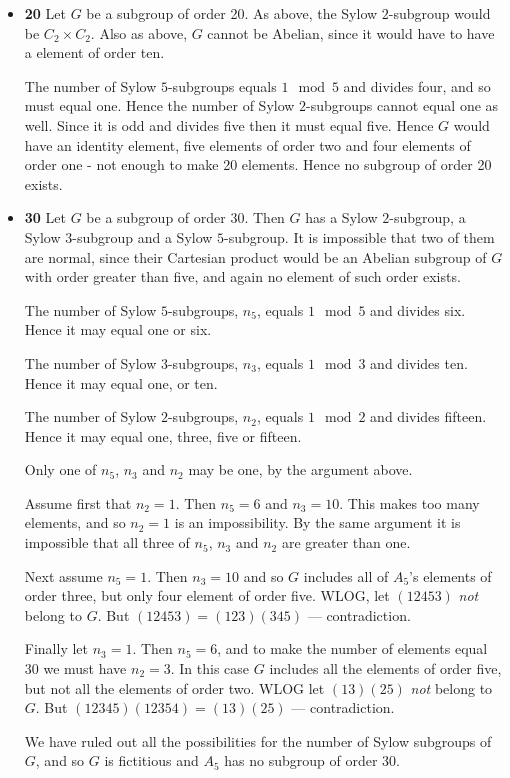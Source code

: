 \documentclass[11pt]{article} \usepackage{amssymb}
\begin{document}
\begin{enumerate}
\begin{itemize}
    \item {\bf 20}
      Let $G$ be a subgroup of order 20.
      As above, the Sylow $2$-subgroup would
      be $C_2\times C_2$. 
      Also as above, $G$  cannot be Abelian, since it would have
      to have a element of order ten.

      The number of Sylow $5$-subgroups equals $1\mod 5$ and divides four,
      and so must equal one. Hence the number of Sylow $2$-subgroups cannot
      equal one as well. Since it is odd and divides five then it must equal
      five. Hence $G$ would have an identity element, five elements of order 
      two and four elements of order one - not enough to make 20 elements.
      Hence no subgroup of order 20 exists.

    \item {\bf 30}
      Let $G$ be a subgroup of order 30. Then $G$ has a Sylow 
      $2$-subgroup, a Sylow $3$-subgroup and a Sylow $5$-subgroup. 
      It is impossible that two of them are normal, since their
      Cartesian product would be an Abelian subgroup of $G$ with order 
      greater than five, and again no element of such order exists.

      The number of Sylow $5$-subgroups, $n_5$, equals $1\mod 5$ and 
      divides six. Hence it may equal one or six.

      The number of Sylow $3$-subgroups, $n_3$, equals $1\mod 3$ and 
      divides ten. Hence it may equal one, or ten.

      The number of Sylow $2$-subgroups, $n_2$, equals $1\mod 2$ and 
      divides fifteen. Hence it may equal one, three, five or fifteen.

      Only one of $n_5$, $n_3$ and $n_2$ may be one, by the argument above.

      Assume first that $n_2=1$. Then $n_5=6$ and $n_3=10$. This makes too 
      many elements, and so $n_2=1$ is an impossibility. By the same argument
      it is impossible that all three of $n_5$, $n_3$ and $n_2$ are greater 
      than one.

      Next assume $n_5=1$. Then $n_3=10$ and so $G$ includes all of $A_5$'s 
      elements of order three, but only four element of order five. WLOG,
      let $(12453)$ {\em not} belong to $G$. But $(12453)=(123)(345)$ --- contradiction.

      Finally let $n_3=1$. Then $n_5=6$, and to make the number of elements
      equal 30 we must have $n_2=3$. In this case $G$ includes all the elements
      of order five, but not all the elements of order two. WLOG let 
      $(13)(25)$ {\em not} belong to $G$. But $(12345)(12354)=(13)(25)$ ---
      contradiction. 

      We have ruled out all the possibilities for the number of Sylow subgroups
      of $G$, and so $G$ is fictitious and $A_5$ has no subgroup of order 30.
    \end{itemize}
\end{enumerate}
\end{document}
